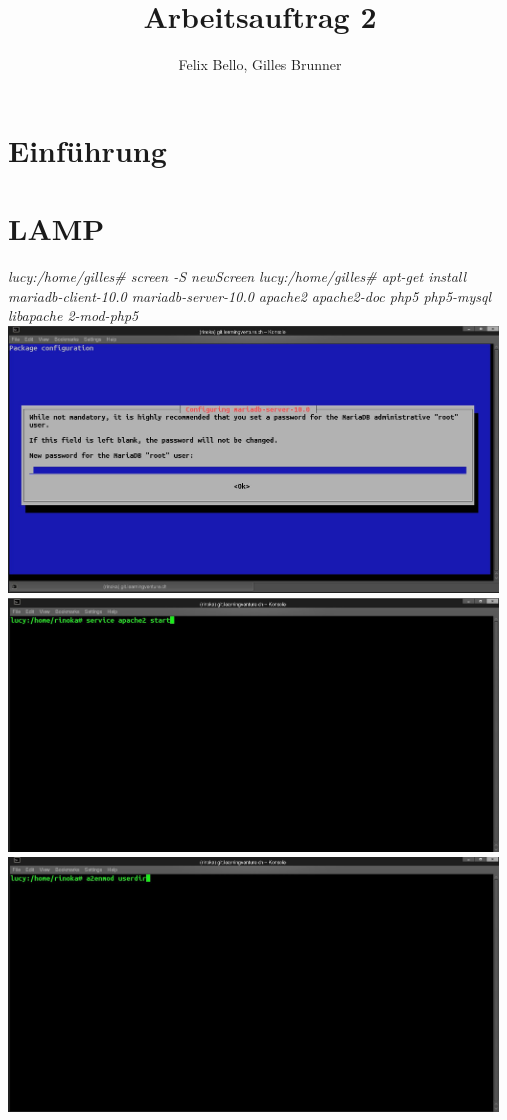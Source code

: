 \documentclass{article}
\author{Felix Bello, Gilles Brunner}
\title{Arbeitsauftrag 2}
\begin{document}
	\maketitle
	\section{Einführung}
	\section{LAMP}
	\textit{lucy:/home/gilles\# screen -S newScreen}
	\newline
	\textit{lucy:/home/gilles\# apt-get install mariadb-client-10.0 mariadb-server-10.0 apache2 apache2-doc php5 php5-mysql libapache 2-mod-php5}
	\newline
	\includegraphics[width=13cm]{../Pics/3-lamp-stack-mariadb}
	\includegraphics[width=13cm]{../Pics/start_apache}
	\includegraphics[width=13cm]{../Pics/a2enmod_userdir}
\end{document}
